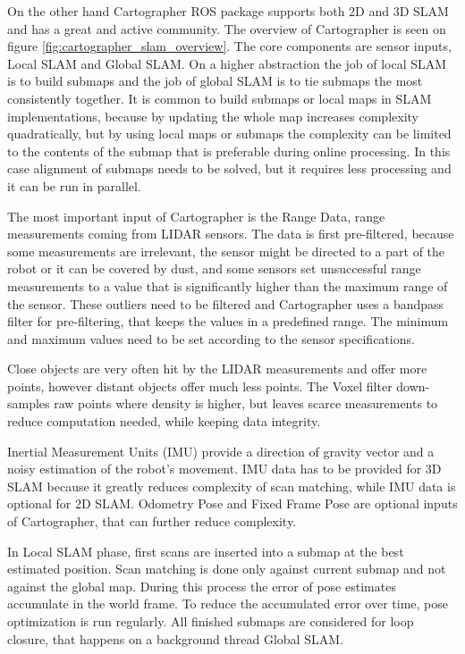 On the other hand Cartographer ROS package supports both 2D and 3D SLAM and has a great and active community. The overview 
of Cartographer is seen on figure \ref{fig:cartographer_slam_overview}. The core components are sensor inputs, Local SLAM
and Global SLAM. On a higher abstraction the job of local SLAM is to build submaps and the job of global SLAM is to tie 
submaps the most consistently together. It is common to build submaps or local maps in SLAM implementations, because by 
updating the whole map increases complexity quadratically, but by using local maps or submaps the complexity can be limited
to the contents of the submap that is preferable during online processing. In this case alignment of submaps needs to be solved,
but it requires less processing and it can be run in parallel.

The most important input of Cartographer is the Range Data, range measurements coming from LIDAR sensors. The data is first 
pre-filtered, because some measurements are irrelevant, the sensor might be directed to a part of the robot or it can be covered
by dust, and some sensors set unsuccessful range measurements to a value that is significantly higher than the maximum range of 
the sensor. These outliers need to be filtered and Cartographer uses a bandpass filter for pre-filtering, that keeps the values
in a predefined range. The minimum and maximum values need to be set according to the sensor specifications. 

Close objects are very often hit by the LIDAR measurements and offer more points, however distant objects offer much less points.
The Voxel filter down-samples raw points where density is higher, but leaves scarce measurements to reduce computation needed,
while keeping data integrity.

Inertial Measurement Units (IMU) provide a direction of gravity vector and a noisy estimation of the robot's movement. IMU data
has to be provided for 3D SLAM because it greatly reduces complexity of scan matching, while IMU data is optional for 2D SLAM.
Odometry Pose and Fixed Frame Pose are optional inputs of Cartographer, that can further reduce complexity.

In Local SLAM phase, first scans are inserted into a submap at the best estimated position. Scan matching is done only against
current submap and not against the global map. During this process the error of pose estimates accumulate in the world frame. 
To reduce the accumulated error over time, pose optimization is run regularly. All finished submaps are considered for loop 
closure, that happens on a background thread Global SLAM.




